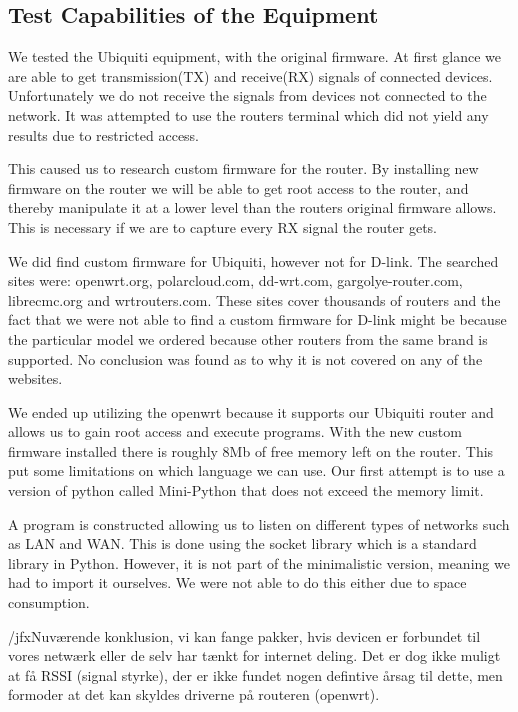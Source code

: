 \subsection*{Test Capabilities of the Equipment}
We tested the Ubiquiti equipment, with the original firmware. At first glance we are able to get transmission(TX) and receive(RX) signals of connected devices. Unfortunately we do not receive the signals from devices not connected to the network. It was attempted to use the routers terminal which did not yield any results due to restricted access.

This caused us to research custom firmware for the router. By installing new firmware on the router we will be able to get root access to the router, and thereby manipulate it at a lower level than the routers original firmware allows. This is necessary if we are to capture every RX signal the router gets.

We did find custom firmware for Ubiquiti, however not for D-link. The searched sites were: openwrt.org, polarcloud.com, dd-wrt.com, gargolye-router.com, librecmc.org and wrtrouters.com. These sites cover thousands of routers and the fact that we were not able to find a custom firmware for D-link might be because the particular model we ordered because other routers from the same brand is supported. No conclusion was found as to why it is not covered on any of the websites.

We ended up utilizing the openwrt because it supports our Ubiquiti router and allows us to gain root access and execute programs. With the new custom firmware installed there is roughly 8Mb of free memory left on the router. This put some limitations on which language we can use. Our first attempt is to use a version of python called Mini-Python that does not exceed the memory limit.

A program is constructed allowing us to listen on different types of networks such as LAN and WAN. This is done using the socket library which is a standard library in Python. However, it is not part of the minimalistic version, meaning we had to import it ourselves. We were not able to do this either due to space consumption.

/jfx{Nuværende konklusion, vi kan fange pakker, hvis devicen er forbundet til vores netwærk eller de selv har tænkt for internet deling. Det er dog ikke muligt at få RSSI (signal styrke), der er ikke fundet nogen defintive årsag til dette, men formoder at det kan skyldes driverne på routeren (openwrt).}